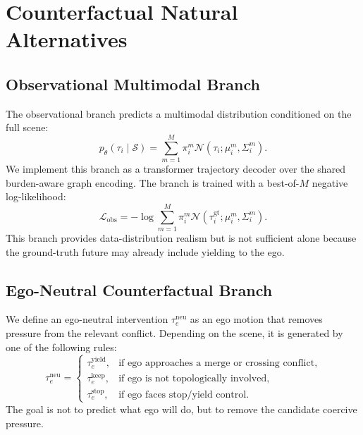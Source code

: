 \documentclass[10pt]{article}
\begin{document}
\section{Counterfactual Natural Alternatives}
\label{app:natural_alternatives}

\subsection{Observational Multimodal Branch}
\label{app:obs_branch}

The observational branch predicts a multimodal distribution conditioned on the full scene:
\begin{equation}
    p_\theta(\tau_i \mid \mathcal{S})
    =
    \sum_{m=1}^{M}
    \pi^m_i
    \mathcal{N}
    \left(
    \tau_i;
    \mu^m_i,
    \Sigma^m_i
    \right).
\end{equation}
We implement this branch as a transformer trajectory decoder over the shared burden-aware graph encoding. The branch is trained with a best-of-$M$ negative log-likelihood:
\begin{equation}
    \mathcal{L}_{\mathrm{obs}}
    =
    -\log
    \sum_{m=1}^{M}
    \pi^m_i
    \mathcal{N}
    \left(
    \tau^{\mathrm{gt}}_i;
    \mu^m_i,
    \Sigma^m_i
    \right).
\end{equation}
This branch provides data-distribution realism but is not sufficient alone because the ground-truth future may already include yielding to the ego.

\subsection{Ego-Neutral Counterfactual Branch}
\label{app:neutral_branch}

We define an ego-neutral intervention $\tau^{\mathrm{neu}}_e$ as an ego motion that removes pressure from the relevant conflict. Depending on the scene, it is generated by one of the following rules:
\begin{equation}
    \tau^{\mathrm{neu}}_e
    =
    \begin{cases}
        \tau^{\mathrm{yield}}_e, & \text{if ego approaches a merge or crossing conflict},\\
        \tau^{\mathrm{keep}}_e, & \text{if ego is not topologically involved},\\
        \tau^{\mathrm{stop}}_e, & \text{if ego faces stop/yield control}.
    \end{cases}
\end{equation}
The goal is not to predict what ego will do, but to remove the candidate coercive pressure.
\end{document}

